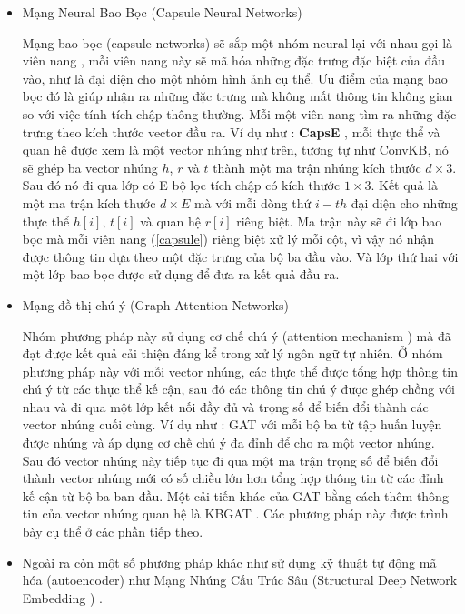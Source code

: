 \begin{itemize}
	\item Mạng Neural Bao Bọc (Capsule Neural Networks)
	
	Mạng bao bọc (capsule networks) sẽ sắp một nhóm neural lại với nhau gọi là viên nang \label{capsule}, mỗi viên nang này sẽ mã hóa những đặc trưng đặc biệt của đầu vào, như là đại diện cho một nhóm hình ảnh cụ thể. Ưu điểm của mạng bao bọc đó là giúp nhận ra những đặc trưng mà không mất thông tin không gian so với việc tính tích chập thông thường. Mỗi một viên nang tìm ra những đặc trưng theo kích thước vector đầu ra. Ví dụ như : \textbf{CapsE} \cite{vu2019capsule}, mỗi thực thể và quan hệ được xem là một vector nhúng như trên, tương tự như ConvKB, nó sẽ ghép ba vector nhúng $h$, $r$ và $t$ thành một ma trận nhúng kích thước $d \times 3$. Sau đó nó đi qua lớp có E bộ lọc tích chập có kích thước $1 \times 3$. Kết quả là một ma trận kích thước $d \times E$ mà với mỗi dòng thứ $i-th$ đại diện cho những thực thể $h[i]$, $t[i]$ và quan hệ $r[i]$ riêng biệt. Ma trận này sẽ đi lớp bao bọc mà mỗi viên nang (\ref{capsule}) riêng biệt xử lý mỗi cột, vì vậy nó nhận được thông tin dựa theo một đặc trưng của bộ ba đầu vào. Và lớp thứ hai với một lớp bao bọc được sử dụng để đưa ra kết quả đầu ra.
	
	\item Mạng đồ thị chú ý (Graph Attention Networks)
	
	Nhóm phương pháp này sử dụng cơ chế chú ý (attention mechanism \cite{vaswani2017attention}) mà đã đạt được kết quả cải thiện đáng kể trong xử lý ngôn ngữ tự nhiên. Ở nhóm phương pháp này với mỗi vector nhúng, các thực thể được tổng hợp thông tin chú ý từ các thực thể kế cận, sau đó các thông tin chú ý được ghép chồng với nhau và đi qua một lớp kết nối đầy đủ và trọng số để biến đổi thành các vector nhúng cuối cùng. Ví dụ như : GAT \cite{velivckovic2017graph} với mỗi bộ ba từ tập huấn luyện được nhúng và áp dụng cơ chế chú ý đa đỉnh để cho ra một vector nhúng. Sau đó vector nhúng này tiếp tục đi qua một ma trận trọng số để biến đổi thành vector nhúng mới có số chiều lớn hơn tổng hợp thông tin từ các đỉnh kế cận từ bộ ba ban đầu. Một cải tiến khác của GAT bằng cách thêm thông tin của vector nhúng quan hệ là KBGAT \cite{nathani2019learning}. Các phương pháp này được trình bày cụ thể ở các phần tiếp theo.
	
	\item Ngoài ra còn một số phương pháp khác như sử dụng kỹ thuật tự động mã hóa (autoencoder) như Mạng Nhúng Cấu Trúc Sâu (Structural Deep Network Embedding \cite{wang2016structural}) .
\end{itemize}

